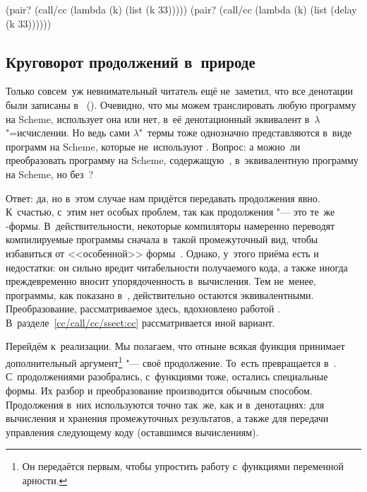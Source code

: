 \begin{code:lisp}
(pair? (call/cc (lambda (k) (list (k 33)))))
(pair? (call/cc (lambda (k) (list (delay (k 33))))))
\end{code:lisp}


\subsection{Круговорот продолжений в~природе}%
\label{denotational/lambdify/ssect:cps}

Только совсем~уж невнимательный читатель ещё не~заметил, что все денотации были
записаны в~ (). Очевидно, что мы можем транслировать любую программу на Scheme,
использует она  или нет, в~её денотационный эквивалент
в~$\lambda$"=исчислении. Но ведь сами $\lambda$"~термы тоже однозначно
представляются в~виде программ на Scheme, которые не~используют .
Вопрос: а можно~ли преобразовать программу на Scheme, содержащую~,
в~эквивалентную программу на Scheme, но без~?

Ответ: да, но в~этом случае нам придётся передавать продолжения явно. К~счастью,
с~этим нет особых проблем, так как продолжения "--- это те~же -формы.
В~действительности, некоторые компиляторы \cite{app92a} намеренно переводят
компилируемые программы сначала в~такой промежуточный вид, чтобы избавиться от
<<особенной>> формы~. Однако, у~этого приёма есть и недостатки: он
сильно вредит читабельности получаемого кода, а также иногда преждевременно
вносит упорядоченность в~вычисления. Тем не~менее, программы, как показано
в~\cite{sf92}, действительно остаются эквивалентными. Преобразование,
рассматриваемое здесь, вдохновлено работой \cite{df90}.
В~разделе~\ref{cc/call/cc/ssect:cc} рассматривается иной вариант.

Перейдём к~реализации. Мы полагаем, что отныне всякая функция принимает
дополнительный аргумент\footnote{Он передаётся первым, чтобы упростить
работу с~функциями переменной арности.} "--- своё продолжение. То~есть
 превращается в~.
С~продолжениями разобрались, с~функциями тоже, остались специальные формы.
Их разбор и преобразование производится обычным способом. Продолжения в~них
используются точно так~же, как и в~денотациях: для вычисления и хранения
промежуточных результатов, а также для передачи управления следующему коду
(оставшимся вычислениям).

